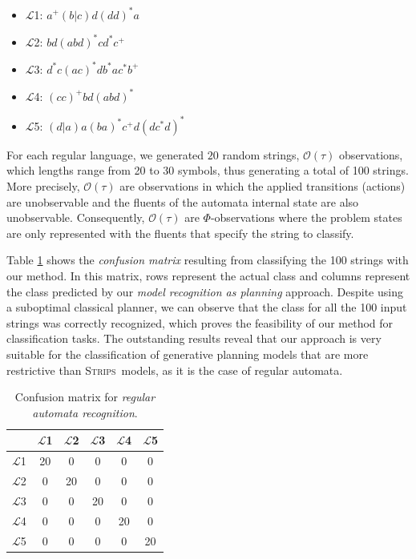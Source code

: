 \documentclass[letterpaper]{article} %
\newcommand{\strips}{\textsc{Strips}}     %
\begin{document}
\begin{itemize}
	\item $\mathcal{L}$1: $a^+(b|c)d(dd)^*a$
	\item $\mathcal{L}$2: $bd(abd)^*cd^*c^+$
	\item $\mathcal{L}$3: $d^*c(ac)^*db^*ac^*b^+$
	\item $\mathcal{L}$4: $(cc)^+bd(abd)^*$
	\item $\mathcal{L}$5: $(d|a)a(ba)^*c^+d(dc^*d)^*$
\end{itemize}

For each regular language, we generated $20$ random strings, $\mathcal{O}(\tau)$ observations, which lengths range from 20 to 30 symbols, thus generating a total of 100 strings. More precisely, $\mathcal{O}(\tau)$ are observations in which the applied transitions (actions) are unobservable and the fluents of the automata internal state are also unobservable. Consequently, $\mathcal{O}(\tau)$ are $\Phi$-observations where the problem states are only represented with the fluents that specify the string to classify.


Table \ref{tab:conf_matrix} shows the {\em confusion matrix} resulting from classifying the 100 strings with our method. In this matrix, rows represent the actual class and columns represent the class predicted by our {\em model recognition as planning} approach. Despite using a suboptimal classical planner, we can observe that the class for all the 100 input strings was correctly recognized, which proves the feasibility of our method for classification tasks. The outstanding results reveal that our approach is very suitable for the classification of generative planning models that are more restrictive than \strips\ models, as it is the case of regular automata.


\begin{table}
	\centering
	\begin{tabular}{c|c|c|c|c|c}
		& $\mathcal{L}$1 & $\mathcal{L}$2 & $\mathcal{L}$3 & $\mathcal{L}$4 & $\mathcal{L}$5\\ \hline
		$\mathcal{L}$1 & 20 & 0 & 0 & 0 & 0 \\
		$\mathcal{L}$2 & 0 & 20 & 0 & 0 & 0 \\
		$\mathcal{L}$3 & 0 & 0 & 20 & 0 & 0 \\
		$\mathcal{L}$4 & 0 & 0 & 0 & 20 & 0 \\
		$\mathcal{L}$5 & 0 & 0 & 0 & 0 & 20 \\
	\end{tabular}
	\caption{Confusion matrix for {\em regular automata recognition}.}
	\label{tab:conf_matrix}
\end{table}
\end{document}
